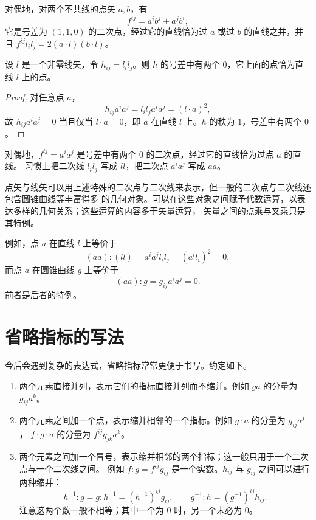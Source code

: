 对偶地，对两个不共线的点矢 $a,b$，有
\[
f^{ij}=a^ib^j+a^jb^i,
\]
它是号差为 $(1,1,0)$ 的二次点，经过它的直线恰为过 $a$ 或过 $b$ 的直线之并，并且
$f^{ij}l_il_j=2(a\cdot l)(b\cdot l)$。

\begin{proposition}[一个线矢的平方]
设 $l$ 是一个非零线矢，令 $h_{ij}=l_il_j$。则 $h$ 的号差中有两个 $0$，它上面的点恰为直线 $l$
上的点。
\end{proposition}

\begin{proof}
对任意点 $a$，
\[
h_{ij}a^ia^j=l_il_ja^ia^j=(l\cdot a)^2,
\]
故 $h_{ij}a^ia^j=0$ 当且仅当 $l\cdot a=0$，即 $a$ 在直线 $l$ 上。$h$ 的秩为 $1$，号差中有两个
$0$。
\end{proof}

对偶地，$f^{ij}=a^ia^j$ 是号差中有两个 $0$ 的二次点，经过它的直线恰为过点 $a$ 的直线。
习惯上把二次线 $l_il_j$ 写成 $ll$，把二次点 $a^ia^j$ 写成 $aa$。

\begin{remark}
点矢与线矢可以用上述特殊的二次点与二次线来表示，但一般的二次点与二次线还包含圆锥曲线等丰富得多
的几何对象。可以在这些对象之间赋予代数运算，以表达多样的几何关系；这些运算的内容多于矢量运算，
矢量之间的点乘与叉乘只是其特例。
\end{remark}

例如，点 $a$ 在直线 $l$ 上等价于
\[
(aa):(ll)=a^ia^jl_il_j=(a^il_i)^2=0,
\]
而点 $a$ 在圆锥曲线 $g$ 上等价于
\[
(aa):g=g_{ij}a^ia^j=0 .
\]
前者是后者的特例。

\section{省略指标的写法}

今后会遇到复杂的表达式，省略指标常常更便于书写。约定如下。

\begin{enumerate}[label=\textbf{(\arabic*)},leftmargin=2.6em]
\item 两个元素直接并列，表示它们的指标直接并列而不缩并。例如 $ga$ 的分量为 $g_{ij}a^k$。
\item 两个元素之间加一个点，表示缩并相邻的一个指标。例如 $g\cdot a$ 的分量为 $g_{ij}a^j$，
$f\cdot g\cdot a$ 的分量为 $f^{ij}g_{jk}a^k$。
\item 两个元素之间加一个冒号，表示缩并相邻的两个指标；这一般只用于一个二次点与一个二次线之间。
例如 $f:g=f^{ij}g_{ij}$ 是一个实数。$h_{ij}$ 与 $g_{ij}$ 之间可以进行两种缩并：
\[
h^{-1}:g=g:h^{-1}=(h^{-1})^{ij}g_{ij},\qquad
g^{-1}:h=(g^{-1})^{ij}h_{ij}.
\]
注意这两个数一般不相等；其中一个为 $0$ 时，另一个未必为 $0$。
\end{enumerate}

